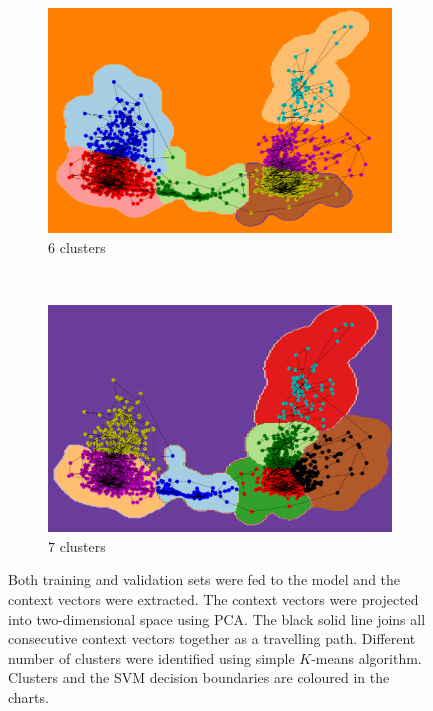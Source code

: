 \documentclass[11pt]{article} %
\theoremstyle{plain}
\theoremstyle{definition}
\begin{document}
\begin{figure}[H]
	\begin{subfigure}[b]{0.48\textwidth}
		\includegraphics[width=\textwidth]{pca_cluster_6.PNG}
		\caption{\(6\) clusters}
		\label{fig:pca_cluster_6}
	\end{subfigure}
	~
	\begin{subfigure}[b]{0.48\textwidth}
		\includegraphics[width=\textwidth]{pca_cluster_7.PNG}
		\caption{\(7\) clusters}
		\label{fig:pca_cluster_7}
	\end{subfigure}

	\caption{Both training and validation sets were fed to the model and the context vectors were extracted. The context vectors were projected into two-dimensional space using PCA. The black solid line joins all consecutive context vectors together as a travelling path. Different number of clusters were identified using simple \(K\)-means algorithm. Clusters and the SVM decision boundaries are coloured in the charts.}
	
	\label{fig:pca_cluster}
\end{figure}
\end{document}
